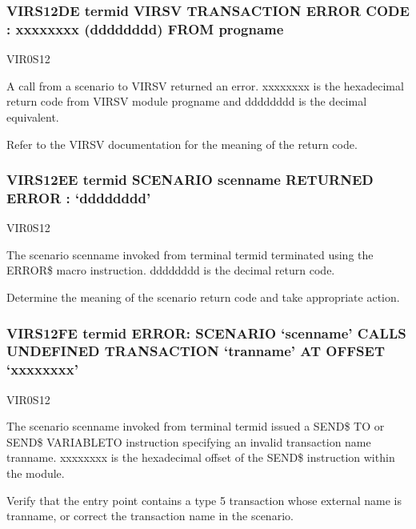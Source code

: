 \documentclass[letterpaper,10pt,english]{sphinxmanual}
\begin{document}
\subsubsection{VIRS12DE termid VIRSV TRANSACTION ERROR CODE : xxxxxxxx (dddddddd) FROM progname}
\label{\detokenize{messages:virs12de-termid-virsv-transaction-error-code-xxxxxxxx-dddddddd-from-progname}}\begin{description}
\sphinxAtStartPar
VIR0S12

\sphinxAtStartPar
A call from a scenario to VIRSV returned an error. xxxxxxxx is the hexadecimal return code from VIRSV module progname and dddddddd is the decimal equivalent.

\sphinxAtStartPar
Refer to the VIRSV documentation for the meaning of the return code.

\end{description}


\subsubsection{VIRS12EE termid SCENARIO scenname RETURNED ERROR : ‘dddddddd’}
\label{\detokenize{messages:virs12ee-termid-scenario-scenname-returned-error-dddddddd}}\begin{description}
\sphinxAtStartPar
VIR0S12

\sphinxAtStartPar
The scenario scenname invoked from terminal termid terminated using the ERROR\$ macro instruction. dddddddd is the decimal return code.

\sphinxAtStartPar
Determine the meaning of the scenario return code and take appropriate action.

\end{description}


\subsubsection{VIRS12FE termid ERROR: SCENARIO ‘scenname’ CALLS UNDEFINED TRANSACTION ‘tranname’ AT OFFSET ‘xxxxxxxx’}
\label{\detokenize{messages:virs12fe-termid-error-scenario-scenname-calls-undefined-transaction-tranname-at-offset-xxxxxxxx}}\begin{description}
\sphinxAtStartPar
VIR0S12

\sphinxAtStartPar
The scenario scenname invoked from terminal termid issued a SEND\$ TO or SEND\$ VARIABLE\sphinxhyphen{}TO instruction specifying an invalid transaction name tranname. xxxxxxxx is the hexadecimal offset of the SEND\$ instruction within the module.

\sphinxAtStartPar
Verify that the entry point contains a type 5 transaction whose external name is tranname, or correct the transaction name in the scenario.

\end{description}
\end{document}
